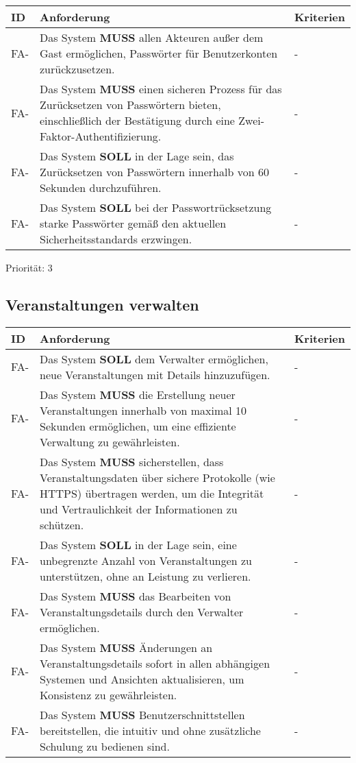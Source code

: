\begin{tabular} {|p{}|p{11cm}|p{}|}
	\hline
	ID & Anforderung & Kriterien \\
	\hline
	FA-
	& Das System \textbf{MUSS} allen Akteuren außer dem Gast  ermöglichen, Passwörter für Benutzerkonten zurückzusetzen. 
	& - \\
	\hline
	FA-
	& Das System \textbf{MUSS} einen sicheren Prozess für das Zurücksetzen von Passwörtern bieten, einschließlich der Bestätigung durch eine Zwei-Faktor-Authentifizierung. 
	& - \\
	\hline
	FA-
	& Das System \textbf{SOLL} in der Lage sein, das Zurücksetzen von Passwörtern innerhalb von 60 Sekunden durchzuführen. 
	& - \\
	\hline
	FA-
	& Das System \textbf{SOLL} bei der Passwortrücksetzung starke Passwörter gemäß den aktuellen Sicherheitsstandards erzwingen. 
	& - \\
	\hline
\end{tabular}
Priorität: 3

\vspace{18pt}

\subsection{Veranstaltungen verwalten}
\begin{tabular} {|p{}|p{11cm}|p{}|}
	\hline
	ID & Anforderung & Kriterien \\
	\hline
	FA-
	& Das System \textbf{SOLL} dem Verwalter ermöglichen, neue Veranstaltungen mit Details hinzuzufügen. 
	& - \\
	\hline
	FA-
	& Das System \textbf{MUSS} die Erstellung neuer Veranstaltungen innerhalb von maximal 10 Sekunden ermöglichen, um eine effiziente Verwaltung zu gewährleisten. 
	& - \\
	\hline
	FA-
	& Das System \textbf{MUSS} sicherstellen, dass Veranstaltungsdaten über sichere Protokolle (wie HTTPS) übertragen werden, um die Integrität und Vertraulichkeit der Informationen zu schützen. 
	& - \\
	\hline
	FA-
	& Das System \textbf{SOLL} in der Lage sein, eine unbegrenzte Anzahl von Veranstaltungen zu unterstützen, ohne an Leistung zu verlieren. 
	& - \\
	\hline
	FA-
	& Das System \textbf{MUSS} das Bearbeiten von Veranstaltungsdetails durch den Verwalter ermöglichen. 
	& - \\
	\hline
	FA-
	& Das System \textbf{MUSS} Änderungen an Veranstaltungsdetails sofort in allen abhängigen Systemen und Ansichten aktualisieren, um Konsistenz zu gewährleisten. 
	& - \\
	\hline
	FA-
	& Das System \textbf{MUSS} Benutzerschnittstellen bereitstellen, die intuitiv und ohne zusätzliche Schulung zu bedienen sind. 
	& - \\
	\hline
\end{tabular}

